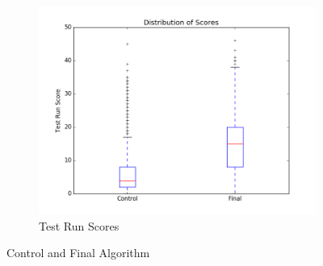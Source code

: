 \documentclass[12pt]{article}
\begin{document}
\begin{figure}[ht]
\begin{subfigure}{0.5\textwidth}
\centering
\includegraphics[width=1\textwidth]{Figures/box_plot}
\caption{Test Run Scores}
\label{fig:final_box_plot}
\end{subfigure}


\caption{Control and Final Algorithm}
\label{fig:fitness_comparison}
\end{figure}
\end{document}
